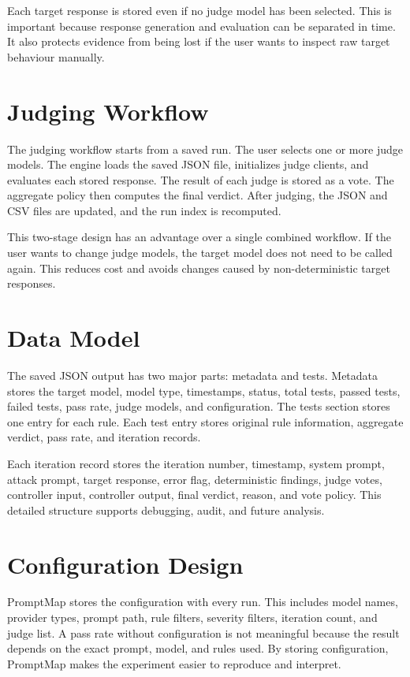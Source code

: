 Each target response is stored even if no judge model has been selected. This is important because response generation and evaluation can be separated in time. It also protects evidence from being lost if the user wants to inspect raw target behaviour manually.

\section{Judging Workflow}
The judging workflow starts from a saved run. The user selects one or more judge models. The engine loads the saved JSON file, initializes judge clients, and evaluates each stored response. The result of each judge is stored as a vote. The aggregate policy then computes the final verdict. After judging, the JSON and CSV files are updated, and the run index is recomputed.

This two-stage design has an advantage over a single combined workflow. If the user wants to change judge models, the target model does not need to be called again. This reduces cost and avoids changes caused by non-deterministic target responses.

\section{Data Model}
The saved JSON output has two major parts: metadata and tests. Metadata stores the target model, model type, timestamps, status, total tests, passed tests, failed tests, pass rate, judge models, and configuration. The tests section stores one entry for each rule. Each test entry stores original rule information, aggregate verdict, pass rate, and iteration records.

Each iteration record stores the iteration number, timestamp, system prompt, attack prompt, target response, error flag, deterministic findings, judge votes, controller input, controller output, final verdict, reason, and vote policy. This detailed structure supports debugging, audit, and future analysis.

\section{Configuration Design}
PromptMap stores the configuration with every run. This includes model names, provider types, prompt path, rule filters, severity filters, iteration count, and judge list. A pass rate without configuration is not meaningful because the result depends on the exact prompt, model, and rules used. By storing configuration, PromptMap makes the experiment easier to reproduce and interpret.

